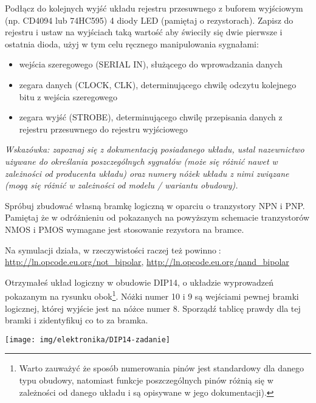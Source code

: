 \dbEntryCheckResults
Podłącz do kolejnych wyjść układu rejestru przesuwnego z buforem wyjściowym (np. CD4094 lub 74HC595) 4 diody LED (pamiętaj o rezystorach).
Zapisz do rejestru i ustaw na wyjściach taką wartość aby świeciły się dwie pierwsze i ostatnia dioda, użyj w tym celu ręcznego manipulowania sygnałami:
\begin{itemize}
\item wejścia szeregowego (SERIAL IN), służącego do wprowadzania danych
\item zegara danych (CLOCK, CLK), determinującego chwilę odczytu kolejnego bitu z wejścia szeregowego
\item zegara wyjść (STROBE), determinującego chwilę przepisania danych z rejestru przesuwnego do rejestru wyjściowego
\end{itemize}

\textit{Wskazówka: zapoznaj się z dokumentacją posiadanego układu, ustal nazewnictwo używane do określania poszczególnych sygnałów (może się różnić nawet w zależności od producenta układu) oraz numery nóżek układu z nimi związane (mogą się różnić w zależności od modelu / wariantu obudowy).}
\fi

\dbEntryCheckResults
Spróbuj zbudować własną bramkę logiczną w oparciu o tranzystory NPN i PNP. Pamiętaj że w odróżnieniu od pokazanych na powyższym schemacie tranzystorów NMOS i PMOS wymagane jest stosowanie rezystora na bramce.

\begin{teacherOnly}
Na symulacji działa, w rzeczywistości raczej też powinno🙂: \url{http://ln.opcode.eu.org/not_bipolar}, \url{http://ln.opcode.eu.org/nand_bipolar}
\end{teacherOnly}
\fi

\dbEntryCheckResults
\noindent\begin{minipage}[t]{\textwidth}
	\noindent\parbox[b]{0.7\textwidth}{
		Otrzymałeś układ logiczny w obudowie DIP14, o układzie wyprowadzeń pokazanym na rysunku obok\footnote{
			Warto zauważyć że sposób numerowania pinów jest standardowy dla danego typu obudowy, natomiast funkcje poszczególnych pinów różnią się w zależności od danego układu i są opisywane w jego dokumentacji).
		}.
		Nóżki numer 10 i 9 są wejściami pewnej bramki logicznej, której wyjście jest na nóżce numer 8. Sporządź tablicę prawdy dla tej bramki i zidentyfikuj co to za bramka.
		\vspace{0.25cm}
	}\hfill\parbox[b]{0.25\textwidth}{
		\texttt{[image: img/elektronika/DIP14-zadanie]}
		\vspace{-0.5cm}
	}
\end{minipage}
\fi

